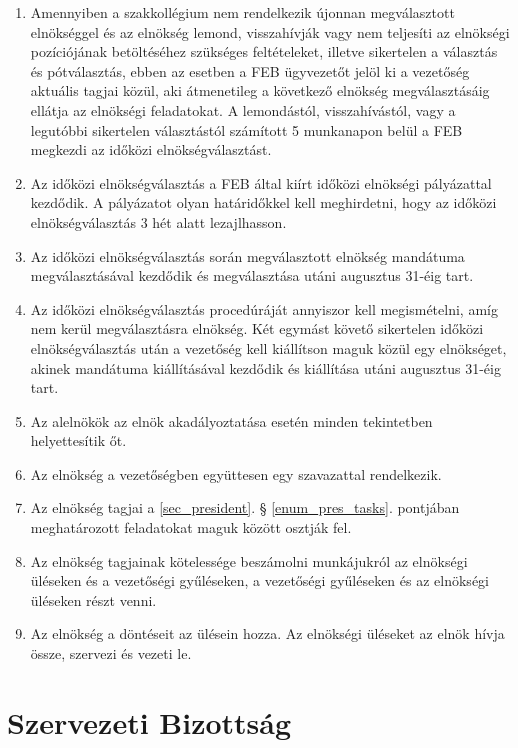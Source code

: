 \documentclass[12pt]{report}
\begin{document}
\begin{enumerate}
  \item Amennyiben a szakkollégium nem rendelkezik újonnan megválasztott elnökséggel és az elnökség lemond, visszahívják vagy nem teljesíti az elnökségi 
    pozíciójának betöltéséhez szükséges feltételeket, illetve sikertelen a választás és pótválasztás, ebben az esetben a FEB ügyvezetőt jelöl ki a 
    vezetőség aktuális tagjai közül, aki átmenetileg a következő elnökség megválasztásáig ellátja az elnökségi feladatokat. A lemondástól, visszahívástól, 
    vagy a legutóbbi sikertelen választástól számított 5 munkanapon belül a FEB megkezdi az időközi elnökségválasztást. \label{enum_presidency_temp}
  \item Az időközi elnökségválasztás a FEB által kiírt időközi elnökségi pályázattal kezdődik. A pályázatot olyan határidőkkel kell meghirdetni, hogy az 
    időközi elnökségválasztás 3 hét alatt lezajlhasson.
  \item Az időközi elnökségválasztás során megválasztott elnökség mandátuma megválasztásával kezdődik és megválasztása utáni augusztus 31-éig tart.
  \item Az időközi elnökségválasztás procedúráját annyiszor kell megismételni, amíg nem kerül megválasztásra elnökség. Két egymást követő sikertelen 
    időközi elnökségválasztás után a vezetőség kell kiállítson maguk közül egy elnökséget, akinek mandátuma kiállításával kezdődik és kiállítása utáni augusztus 31-éig tart.
  \item Az alelnökök az elnök akadályoztatása esetén minden tekintetben helyettesítik őt.
  \item Az elnökség a vezetőségben együttesen egy szavazattal rendelkezik. \label{enum_presidency_voting}
  \item Az elnökség tagjai a \ref{sec_president}. § \ref{enum_pres_tasks}. pontjában meghatározott feladatokat maguk között osztják fel.
  \item Az elnökség tagjainak kötelessége beszámolni munkájukról az elnökségi üléseken és a vezetőségi gyűléseken, a vezetőségi gyűléseken és az elnökségi üléseken részt venni.
  \item Az elnökség a döntéseit az ülésein hozza. Az elnökségi üléseket az elnök hívja össze, szervezi és vezeti le. \label{enum_presidency_meeting}
\end{enumerate}


\section{Szervezeti Bizottság} \label{sec_org_committee}
\end{document}
